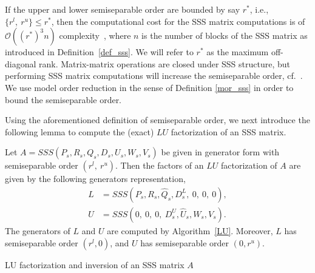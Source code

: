 {If the upper and lower sem\-iseparable order are bounded by say $r^\ast$, i.e., $\{r^l,\ r^u\} \leq
r^*$, then the computational cost for the SSS matrix computations is of 
$\mathcal{O}((r^\ast)^3n)$ complexity~\cite{CD05}, where $n$ is the number of blocks of the SSS matrix as introduced in
Definition~\ref{def_sss}. We will refer to $r^\ast$ as the maximum off-diagonal rank. Matrix-matrix operations are closed under SSS
structure, but performing SSS matrix computations will increase the sem\-iseparable order, cf.~\cite{CD05}. We use model order reduction in the sense of Definition \ref{mor_sss} in order to bound the sem\-iseparable order.

Using the aforementioned definition of sem\-iseparable order, we next introduce the following lemma to compute the (exact) $LU$ factorization of an SSS matrix. 

\begin{lemma}\label{lu_sss}
Let $A = SSS(P_s, R_s, Q_s, D_s, U_s, W_s, V_s)$ be given in generator form with sem\-iseparable order $(r^l,\ r^u)$. Then the factors of an $LU$ factorization of $A$ are given by the following generators representation,
\begin{align*}
L &= SSS(P_s, R_s, \hat{Q}_s, D^L_s,\ 0,\ 0,\ 0), \\ 
U &= SSS(0,\ 0,\ 0,\ D_s^U, \hat{U}_s, W_s, V_s).
\end{align*}
The generators of $L$ and $U$ are computed by Algorithm~\ref{LU}. Moreover, $L$ has sem\-iseparable order $(r^l, 0)$, and $U$ has sem\-iseparable order $(0, r^u)$.
\end{lemma}
\begin{algorithm}[ht]
\caption{LU factorization and inversion of an SSS matrix $A$ \cite{sss_techrep03,VV07}}\label{LU}
\begin{algorithmic}[1]


\end{algorithmic}
\end{algorithm}}
